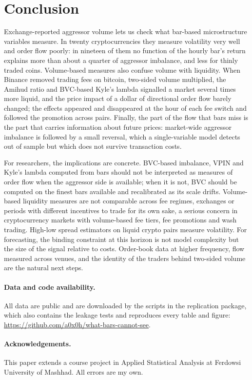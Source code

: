 \documentclass[11pt]{article}
\begin{document}
\section{Conclusion}\label{sec:conclusion}

Exchange-reported aggressor volume lets us check what bar-based microstructure variables measure. In
twenty cryptocurrencies they measure volatility very well and order flow poorly: in nineteen of them
no function of the hourly bar's return explains more than about a quarter of aggressor imbalance,
and less for thinly traded coins. Volume-based measures also confuse volume with liquidity. When Binance removed trading
fees on bitcoin, two-sided volume multiplied, the Amihud ratio and BVC-based Kyle's lambda signalled a
market several times more liquid, and the price impact of a dollar of directional order flow barely
changed; the effects appeared and disappeared at the hour of each fee switch and followed the
promotion across pairs. Finally, the part of the flow that bars miss is the part that carries
information about future prices: market-wide aggressor imbalance is followed by a small reversal,
which a single-variable model detects out of sample but which does not survive transaction costs.

For researchers, the implications are concrete. BVC-based imbalance, VPIN and Kyle's lambda computed
from bars should not be interpreted as measures of order flow when the aggressor side is available;
when it is not, BVC should be computed on the finest bars available and recalibrated as its scale
drifts. Volume-based liquidity measures are not comparable across fee regimes, exchanges or periods
with different incentives to trade for its own sake, a serious concern in cryptocurrency markets with
volume-based fee tiers, fee promotions and wash trading. High-low spread estimators on liquid
crypto pairs measure volatility. For forecasting, the binding constraint at this horizon is not
model complexity but the size of the signal relative to costs. Order-book data at higher frequency,
flow measured across venues, and the identity of the traders behind two-sided volume are the natural
next steps.

\paragraph{Data and code availability.} All data are public and are downloaded by the scripts in the
replication package, which also contains the leakage tests and reproduces every table and figure:
\url{https://github.com/a0x0h/what-bars-cannot-see}.

\paragraph{Acknowledgements.} This paper extends a course project in Applied Statistical Analysis at
Ferdowsi University of Mashhad. All errors are my own.




\clearpage
\appendix

\end{document}
